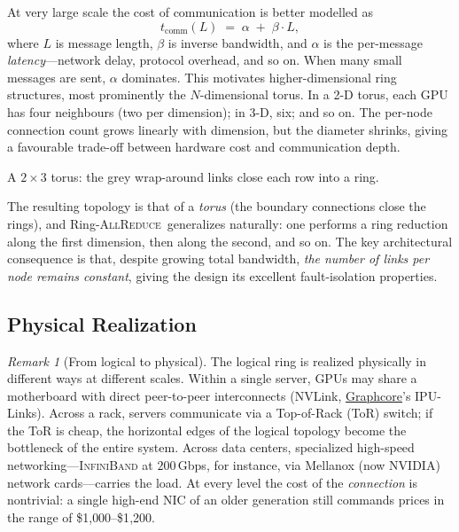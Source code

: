 \documentclass[11pt,a4paper]{article}
\theoremstyle{definition}
\theoremstyle{remark}
\newtheorem*{remark}{Remark}
\theoremstyle{plain}
\newcommand{\allreduce}{\textsc{AllReduce}}
\begin{document}
At very large scale the cost of communication is better modelled as
\[
   t_{\text{comm}}(L) \;=\; \alpha \;+\; \beta \cdot L,
\]
where $L$ is message length, $\beta$ is inverse bandwidth, and $\alpha$ is
the per-message \emph{latency}---network delay, protocol overhead, and so
on. When many small messages are sent, $\alpha$ dominates. This motivates
higher-dimensional ring structures, most prominently the $N$-dimensional
torus. In a 2-D torus, each GPU has four neighbours (two per dimension);
in 3-D, six; and so on. The per-node connection count grows linearly with
dimension, but the diameter shrinks, giving a favourable trade-off between
hardware cost and communication depth.

\begin{center}
\par\smallskip
{\small A $2\times 3$ torus: the grey wrap-around links close each row
into a ring.}
\end{center}

The resulting topology is that of a \emph{torus} (the boundary
connections close the rings), and Ring-\allreduce\ generalizes naturally:
one performs a ring reduction along the first dimension, then along the
second, and so on. The key architectural consequence is that, despite
growing total bandwidth, \emph{the number of links per node remains
constant}, giving the design its excellent fault-isolation properties.

\subsection{Physical Realization}

\begin{remark}[From logical to physical]
The logical ring is realized physically in different ways at different
scales. Within a single server, GPUs may share a motherboard with direct
peer-to-peer interconnects (NVLink, \href{https://www.graphcore.ai/}{Graphcore}'s
IPU-Links). Across a rack, servers communicate via a Top-of-Rack (ToR)
switch; if the ToR is cheap, the horizontal edges of the logical topology
become the bottleneck of the entire system. Across data centers,
specialized high-speed networking---\textsc{InfiniBand} at
$200$\,Gbps, for instance, via Mellanox (now NVIDIA) network cards---carries
the load. At every level the cost of the \emph{connection} is nontrivial:
a single high-end NIC of an older generation still commands prices in the
range of \$1{,}000--\$1{,}200.
\end{remark}
\end{document}
